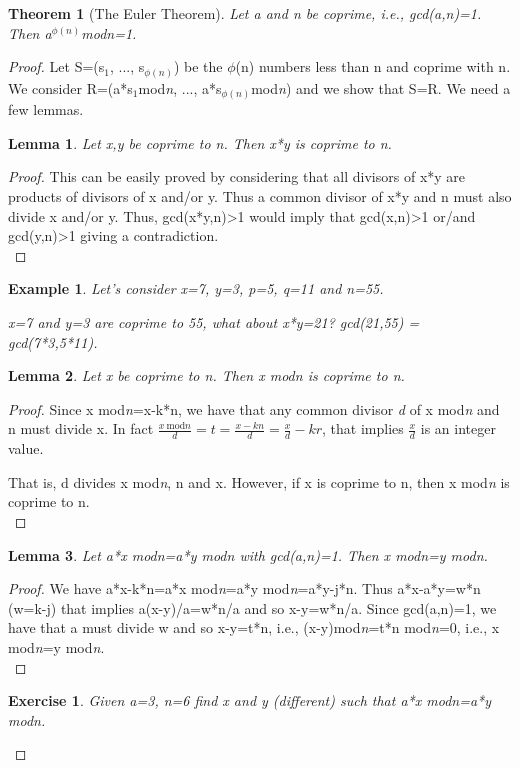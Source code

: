 \documentclass[a4paper, 12pt]{report}
\newtheorem{example}{\textbf{Example}}
\newtheorem{exercise}{\textbf{Exercise}}
\newtheorem{theorem}{\textbf{Theorem}}
\newtheorem{lemma}{\textbf{Lemma}}
\begin{document}
\begin{theorem}[The Euler Theorem]\label{teo:eul}
	Let a and n be coprime, i.e., gcd(a,n)=1. Then a$^{\phi(n)}$mod\textit{n}=1.
\end{theorem}
\begin{proof}
	Let S=(s$_1$, ..., s$_{\phi(n)}$) be the $\phi$(n) numbers less than n and coprime with n. We consider R=(a*s$_1$mod\textit{n}, ..., a*s$_{\phi(n)}$mod\textit{n}) and we show that S=R. We need a few lemmas.
	
	\begin{lemma}\label{lem:EU1}
		Let x,y be coprime to n. Then x*y is coprime to n.
	\end{lemma}
	\begin{proof}
		This can be easily proved by considering that all divisors of x*y are products of divisors of x and/or y. Thus a common divisor of x*y and n must also divide x and/or y. Thus, gcd(x*y,n)>1 would imply that gcd(x,n)>1 or/and gcd(y,n)>1 giving a contradiction.\\
	\end{proof}

	\begin{example}
		Let's consider x=7, y=3, p=5, q=11 and n=55.
		
		x=7 and y=3 are coprime to 55, what about x*y=21? gcd(21,55) = gcd(7*3,5*11).
	\end{example}

	\begin{lemma}\label{lem:EU2}
		Let x be coprime to n. Then x mod\textit{n} is coprime to n.
	\end{lemma}
	\begin{proof}
		Since x mod\textit{n}=x-k*n, we have that any common divisor \textit{d} of x mod\textit{n} and n must divide x. In fact $\frac{x \ \text{mod} n}{d}=t=\frac{x-kn}{d}=\frac{x}{d}-kr$, that implies $\frac{x}{d}$ is an integer value.
		
		That is, d divides x mod\textit{n}, n and x. However, if x is coprime to n, then x mod\textit{n} is coprime to n.\\
	\end{proof}

	\begin{lemma}\label{lem:EU3}
		Let a*x mod\textit{n}=a*y mod\textit{n} with gcd(a,n)=1. Then x mod\textit{n}=y mod\textit{n}.
	\end{lemma}
	\begin{proof}
		We have a*x-k*n=a*x mod\textit{n}=a*y mod\textit{n}=a*y-j*n. Thus a*x-a*y=w*n (w=k-j) that implies a(x-y)/a=w*n/a and so x-y=w*n/a. Since gcd(a,n)=1, we have that a must divide w and so x-y=t*n, i.e., (x-y)mod\textit{n}=t*n mod\textit{n}=0, i.e., x mod\textit{n}=y mod\textit{n}.\\
	\end{proof}
	\begin{exercise}
		Given a=3, n=6 find x and y (different) such that a*x mod\textit{n}=a*y mod\textit{n}.
		

\end{exercise}
\end{proof}
\end{document}
